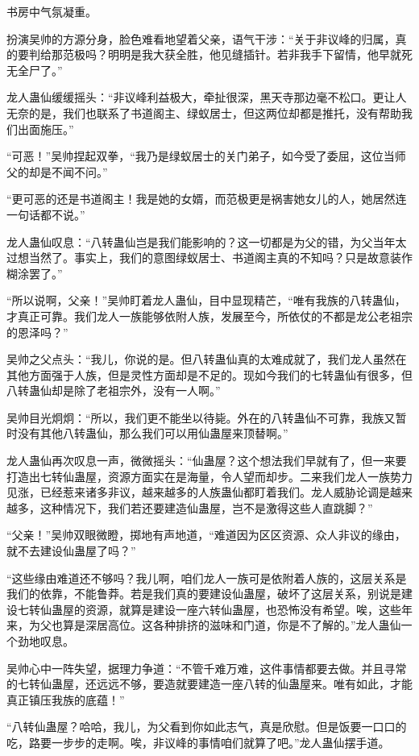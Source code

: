 \begin{this_body}
书房中气氛凝重。

扮演吴帅的方源分身，脸色难看地望着父亲，语气干涉：“关于非议峰的归属，真的要判给那范极吗？明明是我大获全胜，他见缝插针。若非我手下留情，他早就死无全尸了。”

龙人蛊仙缓缓摇头：“非议峰利益极大，牵扯很深，黑天寺那边毫不松口。更让人无奈的是，我们也联系了书道阁主、绿蚁居士，但这两位却都是推托，没有帮助我们出面施压。”

“可恶！”吴帅捏起双拳，“我乃是绿蚁居士的关门弟子，如今受了委屈，这位当师父的却是不闻不问。”

“更可恶的还是书道阁主！我是她的女婿，而范极更是祸害她女儿的人，她居然连一句话都不说。”

龙人蛊仙叹息：“八转蛊仙岂是我们能影响的？这一切都是为父的错，为父当年太过想当然了。事实上，我们的意图绿蚁居士、书道阁主真的不知吗？只是故意装作糊涂罢了。”

“所以说啊，父亲！”吴帅盯着龙人蛊仙，目中显现精芒，“唯有我族的八转蛊仙，才真正可靠。我们龙人一族能够依附人族，发展至今，所依仗的不都是龙公老祖宗的恩泽吗？”

吴帅之父点头：“我儿，你说的是。但八转蛊仙真的太难成就了，我们龙人虽然在其他方面强于人族，但是灵性方面却是不足的。现如今我们的七转蛊仙有很多，但八转蛊仙却是除了老祖宗外，没有一人啊。”

吴帅目光炯炯：“所以，我们更不能坐以待毙。外在的八转蛊仙不可靠，我族又暂时没有其他八转蛊仙，那么我们可以用仙蛊屋来顶替啊。”

龙人蛊仙再次叹息一声，微微摇头：“仙蛊屋？这个想法我们早就有了，但一来要打造出七转仙蛊屋，资源方面实在是海量，令人望而却步。二来我们龙人一族势力见涨，已经惹来诸多非议，越来越多的人族蛊仙都盯着我们。龙人威胁论调是越来越多，这种情况下，我们若还要建造仙蛊屋，岂不是激得这些人直跳脚？”

“父亲！”吴帅双眼微瞪，掷地有声地道，“难道因为区区资源、众人非议的缘由，就不去建设仙蛊屋了吗？”

“这些缘由难道还不够吗？我儿啊，咱们龙人一族可是依附着人族的，这层关系是我们的依靠，不能鲁莽。若是我们真的要建设仙蛊屋，破坏了这层关系，别说是建设七转仙蛊屋的资源，就算是建设一座六转仙蛊屋，也恐怖没有希望。唉，这些年来，为父也算是深居高位。这各种排挤的滋味和门道，你是不了解的。”龙人蛊仙一个劲地叹息。

吴帅心中一阵失望，据理力争道：“不管千难万难，这件事情都要去做。并且寻常的七转仙蛊屋，还远远不够，要造就要建造一座八转的仙蛊屋来。唯有如此，才能真正镇压我族的底蕴！”

“八转仙蛊屋？哈哈，我儿，为父看到你如此志气，真是欣慰。但是饭要一口口的吃，路要一步步的走啊。唉，非议峰的事情咱们就算了吧。”龙人蛊仙摆手道。


\end{this_body}
